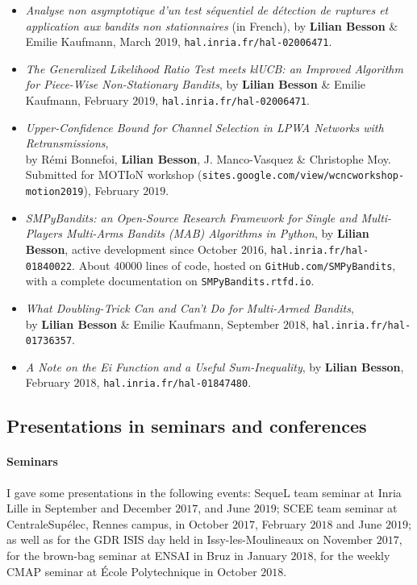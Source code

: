\begin{itemize}
\item
    \emph{Analyse non asymptotique d'un test séquentiel de détection de ruptures et application aux bandits non stationnaires} (in French),
    by \textbf{Lilian Besson} \& Emilie Kaufmann, March $2019$,
    \texttt{hal.inria.fr/hal-02006471}.
\item
    \emph{The Generalized Likelihood Ratio Test meets klUCB: an Improved Algorithm for Piece-Wise Non-Stationary Bandits},
    by \textbf{Lilian Besson} \& Emilie Kaufmann, February $2019$,
    \texttt{hal.inria.fr/hal-02006471}.

\item
    \emph{Upper-Confidence Bound for Channel Selection in LPWA Networks with Retransmissions},\\
    by Rémi Bonnefoi, \textbf{Lilian Besson}, J. Manco-Vasquez \& Christophe Moy.
    Submitted for MOTIoN workshop (\texttt{sites.google.com/view/wcncworkshop-motion2019}), February $2019$.

\item
    \emph{SMPyBandits: an Open-Source Research Framework for Single and Multi-Players Multi-Arms Bandits (MAB) Algorithms in Python},
    by \textbf{Lilian Besson}, active development since October $2016$,
    \texttt{hal.inria.fr/hal-01840022}.
    About $40000$ lines of code, hosted on \texttt{GitHub.com/SMPyBandits},
    with a complete documentation on \texttt{SMPyBandits.rtfd.io}.

\item
    \emph{What Doubling-Trick Can and Can't Do for Multi-Armed Bandits},\\
    by \textbf{Lilian Besson} \& Emilie Kaufmann, September $2018$,
    \texttt{hal.inria.fr/hal-01736357}.

\item
    \emph{A Note on the Ei Function and a Useful Sum-Inequality},
    by \textbf{Lilian Besson},
    February $2018$,
    \texttt{hal.inria.fr/hal-01847480}.

\end{itemize}


\subsection{Presentations in seminars and conferences}

\paragraph{Seminars} I gave some presentations in the following events:
    SequeL team seminar at Inria Lille in September and December $2017$, and June $2019$;
    SCEE team seminar at CentraleSupélec, Rennes campus, in October $2017$, February $2018$ and June $2019$;
    as well as
    for the GDR ISIS day held in Issy-les-Moulineaux on November $2017$,
    for the brown-bag seminar at ENSAI in Bruz in January $2018$,
    for the weekly CMAP seminar at École Polytechnique in October $2018$.

